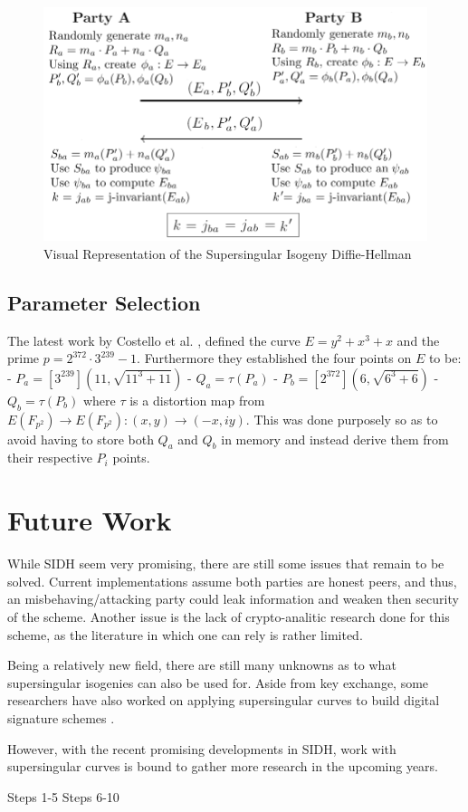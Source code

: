 \documentclass[10pt,twocolumn]{article} %
\begin{document}
\begin{figure}[t]
\centering
\includegraphics[width=1.02\linewidth]{sidh}
\caption{Visual Representation of the Supersingular Isogeny Diffie-Hellman}
\label{fig:sidh}
\end{figure}


\subsection{Parameter Selection}
\label{sec:params}
The latest work by Costello et al. \cite{costello2016}, defined the curve $E = y^2+x^3 +x$ and the prime $p = 2^{372}\cdot 3^{239}-1$. Furthermore they established the four points on $E$ to be:
- $P_{a} = [3^{239}](11,\sqrt{11^3+11})$ \newline
- $Q_a=\tau(P_a)$ \newline
- $P_b=[2^{372}](6,\sqrt{6^3+6})$ \newline
- $Q_b=\tau(P_b)$ \newline
where $\tau$ is a distortion map from $E(F_{p^2})\rightarrow E(F_{p^2}) : (x,y) \rightarrow (-x,iy)$. This was done purposely so as to avoid having to store both $Q_a$ and $Q_b$ in memory and instead derive them from their respective $P_i$ points.

\section{Future Work}
While SIDH seem very promising, there are still some issues that remain to be solved. Current implementations assume both parties are honest peers, and thus, an misbehaving/attacking party could leak information and weaken then security of the scheme. Another issue is the lack of crypto-analitic research done for this scheme, as the literature in which one can rely is rather limited.
\par Being a relatively new field, there are still many unknowns as to what supersingular isogenies can also be used for. Aside from key exchange, some researchers have also worked on applying supersingular curves to build digital signature schemes \cite{jao2014isogeny,sun2014toward}. 
\par However, with the recent promising developments in SIDH, work with supersingular curves is bound to gather more research in the upcoming years. 
\par Steps 1-5
Steps 6-10





\end{document}
